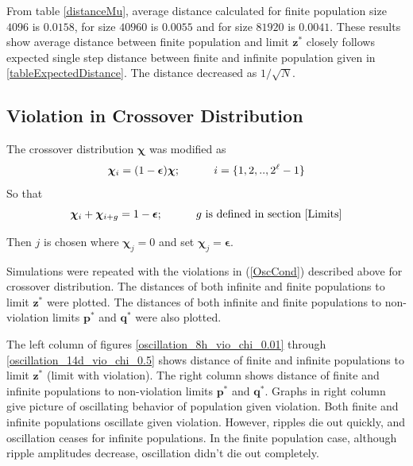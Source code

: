 

From table \ref{distanceMu}, average distance calculated for finite population size $4096$ is $0.0158$, 
for size $40960$ is $0.0055$ and for size $81920$ is $0.0041$. These results show average distance 
between finite population and limit $\bm{z^\ast}$ closely follows expected single step distance 
between finite and infinite population given in \ref{tableExpectedDistance}. The distance decreased as $1/\sqrt{N}$.

\subsection{Violation in Crossover Distribution}
The crossover distribution $\bm{\chi}$ was modified as
\[
\bm{\chi}_i = (1-\bm{\epsilon}) \bm{\chi} ; \hspace{30pt} i = \{1, 2,.., 2^{\ell}-1\} 
\]
So that 
\[
\bm{\chi}_i + \bm{\chi}_{i+g} = 1-\bm{\epsilon} ; \hspace{30pt} g \text{ is defined in  section } \ref{Limits}
\]

Then $j$ is chosen where $\bm{\chi}_j = 0$ and set $\bm{\chi}_j = \bm{\epsilon}$. 

Simulations were repeated with the violations in (\ref{OscCond}) described above for crossover distribution.
The distances of both infinite and finite populations to limit $\bm{z}^\ast$ were plotted. 
The distances of both infinite and finite populations to non-violation limits $\bm{p}^\ast$ and $\bm{q}^\ast$ were also plotted.



The left column of figures \ref{oscillation_8h_vio_chi_0.01} through \ref{oscillation_14d_vio_chi_0.5} 
shows distance of finite and infinite populations to limit $\bm{z^\ast}$ (limit with violation). The 
right column shows distance of finite and infinite populations to non-violation limits $\bm{p^\ast}$ and $\bm{q^\ast}$. 
Graphs in right column give picture of oscillating behavior of population given violation. 
Both finite and infinite populations oscillate given violation. However, ripples die out quickly, 
and oscillation ceases for infinite populations.
In the finite population case, although ripple amplitudes decrease, oscillation didn't die out completely. 

